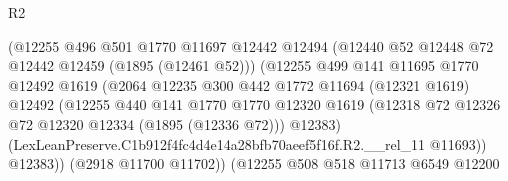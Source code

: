 \begin{lexlean}{R2}
\begin{coremodule}
                                        (@12255
                                          @496
                                          @501
                                          @1770
                                          @11697
                                          @12442
                                          @12494
                                          (@12440 @52 @12448 @72 @12442 @12459 (@1895 (@12461 @52)))
                                          (@12255
                                            @499
                                            @141
                                            @11695
                                            @1770
                                            @12492
                                            @1619
                                            (@2064
                                              @12235
                                              @300
                                              @442
                                              @1772
                                              @11694
                                              (@12321 @1619)
                                              @12492
                                              (@12255
                                                @440
                                                @141
                                                @1770
                                                @1770
                                                @12320
                                                @1619
                                                (@12318
                                                  @72
                                                  @12326
                                                  @72
                                                  @12320
                                                  @12334
                                                  (@1895 (@12336 @72)))
                                                @12383)
                                              (LexLeanPreserve.C1b912f4fc4d4e14a28bfb70aeef5f16f.R2.__rel_11
                                                @11693))
                                            @12383))
                                        (@2918 @11700 @11702))
                                      (@12255
                                        @508
                                        @518
                                        @11713
                                        @6549
                                        @12200

\end{coremodule}
\end{lexlean}
